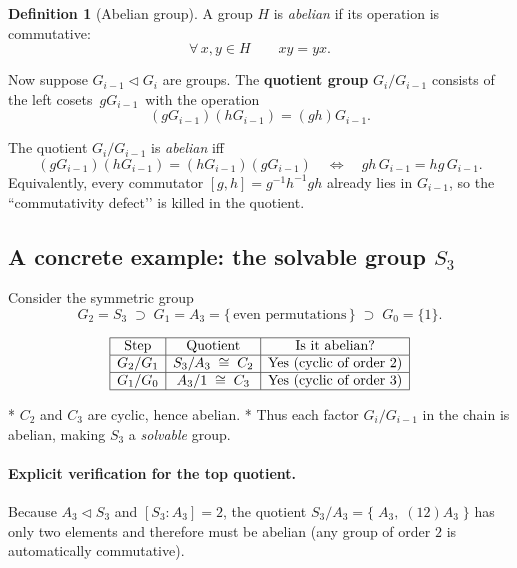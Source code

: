 \documentclass[12pt]{article}
\theoremstyle{definition} %
\newtheorem{definition}{Definition}
\theoremstyle{plain} %
\begin{document}
\begin{definition}[Abelian group]
A group \(H\) is \emph{abelian} if its operation is commutative:
\[
   \forall\,x,y\in H \qquad xy = yx .
\]
\end{definition}

Now suppose \(G_{i-1}\lhd G_i\) are groups.  
The \textbf{quotient group} \(G_i/G_{i-1}\) consists of the left cosets
\(\,gG_{i-1}\,\) with the operation
\[
   (gG_{i-1})(hG_{i-1}) = (gh)G_{i-1}.
\]

The quotient \(G_i/G_{i-1}\) is \emph{abelian} iff
\[
   (gG_{i-1})(hG_{i-1})=(hG_{i-1})(gG_{i-1})
   \quad\Longleftrightarrow\quad
   gh\,G_{i-1}=hg\,G_{i-1}.
\]
Equivalently, every commutator \([g,h]=g^{-1}h^{-1}gh\) already lies in
\(G_{i-1}\), so the “commutativity defect’’ is killed in the quotient.

\subsection*{A concrete example: the solvable group \(S_3\)}

Consider the symmetric group
\[
   G_2=S_3
   \;\supset\;
   G_1=A_3=\{\,\text{even permutations}\,\}
   \;\supset\;
   G_0=\{1\}.
\]

\[
\begin{array}{|c|c|c|}
\hline
\text{Step} & \text{Quotient} & \text{Is it abelian?} \\ \hline
G_2/G_1 & S_3/A_3\;\cong\;C_2 & \text{Yes (cyclic of order $2$)} \\ \hline
G_1/G_0 & A_3/1\;\cong\;C_3 & \text{Yes (cyclic of order $3$)} \\ \hline
\end{array}
\]

* \(C_2\) and \(C_3\) are cyclic, hence abelian.
* Thus each factor \(G_i/G_{i-1}\) in the chain is abelian, making
  \(S_3\) a \emph{solvable} group.

\paragraph{Explicit verification for the top quotient.}
Because \(A_3\lhd S_3\) and \([S_3:A_3]=2\), the quotient
\(S_3/A_3=\{\;A_3,\;(12)A_3\;\}\) has only two elements and therefore
must be abelian (any group of order \(2\) is automatically commutative).

\end{document}
